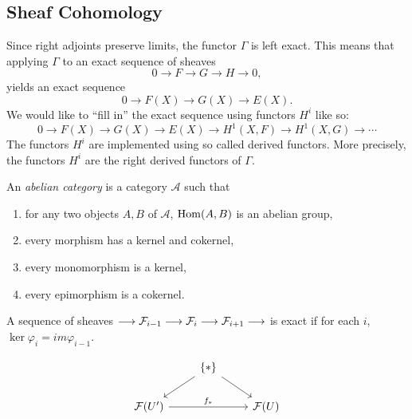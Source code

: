 \subsection{Sheaf Cohomology}
Since right adjoints preserve limits, the functor $\Gamma$ is left exact. This means that applying $\Gamma$ to an exact sequence of sheaves 
\[0 \to F \to G \to H \to 0,\]
yields an exact sequence
\[0 \to F(X) \to G(X) \to E(X).\]
We would like to ``fill in'' the exact sequence using functors $H^i$ like so:
\[0 \to F(X) \to G(X) \to E(X) \to H^1(X, F) \to H^1(X,G) \to\cdots \]
The functors $H^i$ are implemented using so called derived functors. More precisely, the functors $H^i$ are the right derived functors of $\Gamma$.

\begin{remark}
	An \textit{abelian category} is a category $\mathcal{A}$ such that
	\begin{enumerate}
		\item for any two objects $A,B$ of $\mathcal{A}$, $\operatorname{Hom}(A,B)$ is an abelian group,
		\item every morphism has a kernel and cokernel,
		\item every monomorphism is a kernel,
		\item every epimorphism is a cokernel.
	\end{enumerate}
\end{remark}

\begin{definition}
  A sequence of sheaves $\longrightarrow \mathcal{F}_{i-1} \longrightarrow \mathcal{F}_{i} \longrightarrow \mathcal{F}_{i+1} \longrightarrow$
	is exact if for each $i$, $\ker \varphi_i = im \varphi_{i-1}$.
\end{definition}

\[
	\begin{tikzcd}
		& {\{*\}} \\
		{\Sh{F}(U')} && {\Sh{F}(U)}
		\arrow[from=1-2, to=2-1]
		\arrow["{f_*}", from=2-1, to=2-3]
		\arrow[from=1-2, to=2-3]
	\end{tikzcd}
\]
